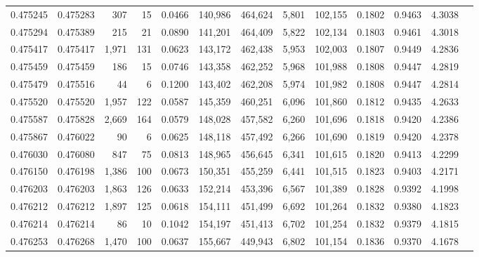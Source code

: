 \begin{tabular}{rrrrrrrrrrrrr}
0.475245 & 0.475283 &   307 &    15 &                                     0.0466 & 140,986 & 464,624 &   5,801 & 102,155 & 0.1802 & 0.9463 & 4.3038 \\
0.475294 & 0.475389 &   215 &    21 &                                     0.0890 & 141,201 & 464,409 &   5,822 & 102,134 & 0.1803 & 0.9461 & 4.3018 \\
0.475417 & 0.475417 & 1,971 &   131 &                                     0.0623 & 143,172 & 462,438 &   5,953 & 102,003 & 0.1807 & 0.9449 & 4.2836 \\
0.475459 & 0.475459 &   186 &    15 &                                     0.0746 & 143,358 & 462,252 &   5,968 & 101,988 & 0.1808 & 0.9447 & 4.2819 \\
0.475479 & 0.475516 &    44 &     6 &                                     0.1200 & 143,402 & 462,208 &   5,974 & 101,982 & 0.1808 & 0.9447 & 4.2814 \\
0.475520 & 0.475520 & 1,957 &   122 &                                     0.0587 & 145,359 & 460,251 &   6,096 & 101,860 & 0.1812 & 0.9435 & 4.2633 \\
0.475587 & 0.475828 & 2,669 &   164 &                                     0.0579 & 148,028 & 457,582 &   6,260 & 101,696 & 0.1818 & 0.9420 & 4.2386 \\
0.475867 & 0.476022 &    90 &     6 &                                     0.0625 & 148,118 & 457,492 &   6,266 & 101,690 & 0.1819 & 0.9420 & 4.2378 \\
0.476030 & 0.476080 &   847 &    75 &                                     0.0813 & 148,965 & 456,645 &   6,341 & 101,615 & 0.1820 & 0.9413 & 4.2299 \\
0.476150 & 0.476198 & 1,386 &   100 &                                     0.0673 & 150,351 & 455,259 &   6,441 & 101,515 & 0.1823 & 0.9403 & 4.2171 \\
0.476203 & 0.476203 & 1,863 &   126 &                                     0.0633 & 152,214 & 453,396 &   6,567 & 101,389 & 0.1828 & 0.9392 & 4.1998 \\
0.476212 & 0.476212 & 1,897 &   125 &                                     0.0618 & 154,111 & 451,499 &   6,692 & 101,264 & 0.1832 & 0.9380 & 4.1823 \\
0.476214 & 0.476214 &    86 &    10 &                                     0.1042 & 154,197 & 451,413 &   6,702 & 101,254 & 0.1832 & 0.9379 & 4.1815 \\
0.476253 & 0.476268 & 1,470 &   100 &                                     0.0637 & 155,667 & 449,943 &   6,802 & 101,154 & 0.1836 & 0.9370 & 4.1678 \\

\end{tabular}
